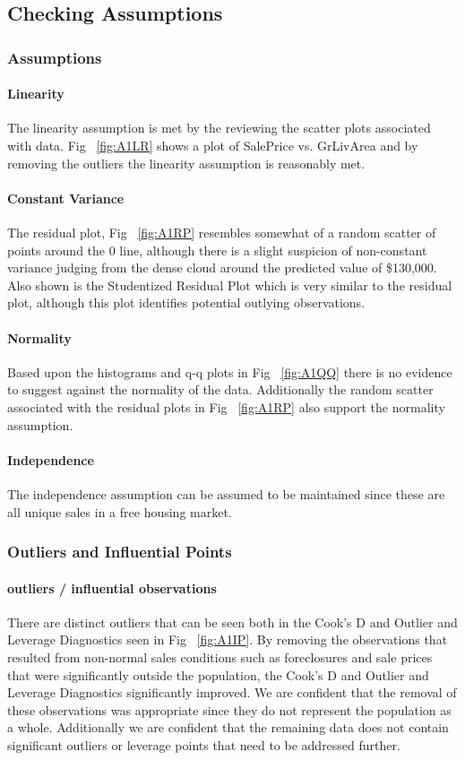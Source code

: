 \documentclass[11pt]{scrartcl} %
\begin{document}

\subsection{Checking Assumptions}
\subsubsection{Assumptions}
\paragraph{Linearity} The linearity assumption is met by the reviewing the scatter plots associated with data. Fig ~\ref{fig:A1LR} shows a plot of SalePrice vs. GrLivArea and by removing the outliers the linearity assumption is reasonably met. 
\paragraph{Constant Variance} The residual plot, Fig ~\ref{fig:A1RP} resembles somewhat of a random scatter of points around the 0 line, although there is a slight suspicion of non-constant variance judging from the dense cloud around the predicted value of \$130,000. Also shown is the Studentized Residual Plot which is very similar to the residual plot, although this plot identifies potential outlying observations.
\paragraph{Normality} Based upon the histograms and q-q plots in Fig ~\ref{fig:A1QQ} there is no evidence to suggest against the normality of the data. Additionally the random scatter associated with the residual plots in Fig ~\ref{fig:A1RP} also support the normality assumption.
\paragraph{Independence} The independence assumption can be assumed to be maintained since these are all unique sales in a free housing market. 
\subsubsection{Outliers and Influential Points}
\paragraph{outliers / influential observations} There are distinct outliers that can be seen both in the Cook's D and Outlier and Leverage Diagnostics seen in Fig ~\ref{fig:A1IP}. By removing the observations that resulted from non-normal sales conditions such as foreclosures and sale prices that were significantly outside the population, the Cook's D and Outlier and Leverage Diagnostics significantly improved. We are confident that the removal of these observations was appropriate since they do not represent the population as a whole. Additionally we are confident that the remaining data does not contain significant outliers or leverage points that need to be addressed further.
\end{document}
